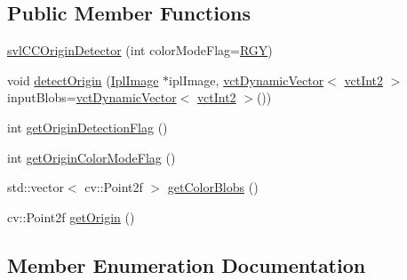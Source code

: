 \subsection*{Public Member Functions}
\begin{DoxyCompactItemize}
\item 
\hyperlink{classsvl_c_c_origin_detector_adf123af9eee12c51438f516cd884fa34}{svl\+C\+C\+Origin\+Detector} (int color\+Mode\+Flag=\hyperlink{classsvl_c_c_origin_detector_abc46027473187db71ca84294e3df9554a9cf1aba344d3244ebdbb4de099f3c181}{R\+G\+Y})
\item 
void \hyperlink{classsvl_c_c_origin_detector_a2b7715df60215e7dffe1dfafe9c055e5}{detect\+Origin} (\hyperlink{svl_types_8h_aa5a40a13021ba9708bfe921e18fdfa53}{Ipl\+Image} $\ast$ipl\+Image, \hyperlink{classvct_dynamic_vector}{vct\+Dynamic\+Vector}$<$ \hyperlink{vct_fixed_size_vector_types_8h_add8c88eb6a432b15f14b866b9c35325f}{vct\+Int2} $>$ input\+Blobs=\hyperlink{classvct_dynamic_vector}{vct\+Dynamic\+Vector}$<$ \hyperlink{vct_fixed_size_vector_types_8h_add8c88eb6a432b15f14b866b9c35325f}{vct\+Int2} $>$())
\item 
int \hyperlink{classsvl_c_c_origin_detector_a44a4e5f3804483c913f272bdff7e58e5}{get\+Origin\+Detection\+Flag} ()
\item 
int \hyperlink{classsvl_c_c_origin_detector_ad8df87bea63619953140d015634325b6}{get\+Origin\+Color\+Mode\+Flag} ()
\item 
std\+::vector$<$ cv\+::\+Point2f $>$ \hyperlink{classsvl_c_c_origin_detector_a332da38c8a61afd8a057ce4b0dba246c}{get\+Color\+Blobs} ()
\item 
cv\+::\+Point2f \hyperlink{classsvl_c_c_origin_detector_a5c8741c7f39db88ae235766458eb8607}{get\+Origin} ()
\end{DoxyCompactItemize}


\subsection{Member Enumeration Documentation}
\hypertarget{classsvl_c_c_origin_detector_a1e4dabe83f94a0b1b889ecf59b3c86e5}{}
